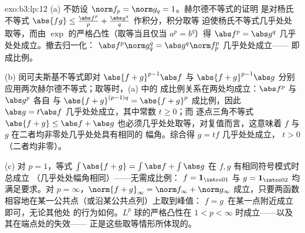 \begin{solution}{exo:b3:lp:12}
(a) 不妨设 $\norm f_p = \norm g_q = 1$。赫尔德不等式的证明
是对杨氏不等式 $\abs{fg} \leq
\frac{\abs f^p}p + \frac{\abs g^q}q$ 作积分，积分取等
迫使杨氏不等式几乎处处取等，而由
$\exp$ 的严格凸性（取等当且仅当 $a^p = b^q$）得 $\abs
f^p = \abs g^q$ 几乎处处成立。撤去归一化：
$\abs f^p\norm g_q^q = \abs g^q\norm f_p^p$ 几乎处处成立——
即成比例。

(b) 闵可夫斯基不等式即对 $\abs{f + g}^{p-1}
\abs f$ 与 $\abs{f+g}^{p-1}\abs g$ 分别应用两次赫尔德不等式；取等时，(a) 中的
成比例关系在两处均成立：$\abs f^p$ 与 $\abs g^p$ 各自
与 $\abs{f+g}^{(p-1)q} = \abs{f+g}^p$ 成比例，因此
$\abs g = t\abs f$ 几乎处处成立，其中常数 $t \geq 0$；而
逐点三角不等式 $\abs{f + g} \leq
\abs f + \abs g$ 也必须几乎处处取等，对复值而言，这意味着
$f$ 与 $g$ 在二者均非零处几乎处处具有相同的
幅角。综合得 $g = tf$ 几乎处处成立，
$t > 0$（二者均非零）。

(c) 对 $p = 1$，等式 $\int\abs{f + g} = \int\abs f +
\int\abs g$ 在 $f, g$ 有相同符号模式时总成立
（几乎处处幅角相同）——无需成比例：
$f = \mathbf 1_{\intcc01}$ 与 $g = \mathbf 1_{\intcc02}$
均满足要求。对 $p = \infty$，$\norm{f+g}_\infty = \norm f_\infty +
\norm g_\infty$ 成立，只要两函数
相容地在某一公共点（或沿某公共点列）上取到峰值：
$f = g\,$ 在某一点附近成立即可，无论其他处
的行为如何。$L^p$ 球的严格凸性在 $1 <
p < \infty$ 时成立——以及其在端点处的失效——
正是这些取等情形所体现的。
\end{solution}

